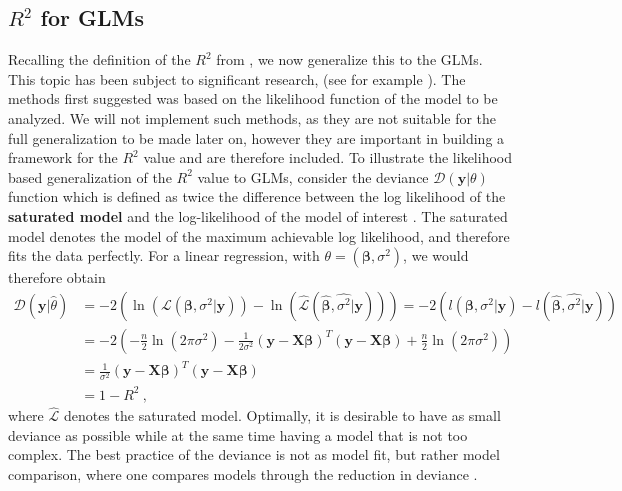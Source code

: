 \subsection{$R^2$ for GLMs}
Recalling the definition of the $R^2$ from , we now generalize this to the GLMs. This topic has been subject to significant research, (see for example \citet{maddala1983limited, cameron1997r, menard2000coefficients,  nakagawa2013general}). The methods first suggested was based on the likelihood function of the model to be analyzed. We will not implement such methods, as they are not suitable for the full generalization to be made later on, however they are important in building a framework for the $R^2$ value and are therefore included.
To illustrate the likelihood based generalization of the $R^2$ value to GLMs, consider the deviance $\mathcal{D}(\mathbf{y}\lvert \theta)$ function which is defined as twice the difference between the log likelihood of the \textbf{saturated model} and the log-likelihood of the model of interest \citep{GLMM_book_old}.
The saturated model denotes the model of the maximum achievable log likelihood, and therefore fits the data perfectly. 
For a linear regression, with $\theta=(\boldsymbol{\beta}, \sigma^2)$, we would therefore obtain
\begin{equation}
    \begin{aligned}
    \mathcal{D}(\mathbf{y}\lvert \hat{\theta}) &= -2\left( \ln(\mathcal{L}(\boldsymbol{\beta}, \sigma^2 \lvert \mathbf{y})) - \ln(\mathcal{\hat{L}}(\boldsymbol{\hat{\beta}}, \hat{\sigma^2} \lvert \mathbf{y}))  \right) = -2\left( l(\boldsymbol{\beta}, \sigma^2 \lvert \mathbf{y}) - l(\boldsymbol{\hat{\beta}}, \hat{\sigma^2} \lvert \mathbf{y})  \right) \\
    & = -2\left(-\frac{n}{2}\ln(2\pi\sigma^2) - \frac{1}{2\sigma^2} (\mathbf{y}-\mathbf{X}\boldsymbol{\beta})^T(\mathbf{y}-\mathbf{X}\boldsymbol{\beta}) + \frac{n}{2}\ln(2\pi\sigma^2)  \right) \\
    & = \frac{1}{\sigma^2} (\mathbf{y}-\mathbf{X}\boldsymbol{\beta})^T(\mathbf{y}-\mathbf{X}\boldsymbol{\beta}) \\
    & = 1-R^2 \ ,
    \end{aligned}
\end{equation}
where $\mathcal{\hat{L}}$ denotes the saturated model.
Optimally, it is desirable to have as small deviance as possible while at the same time having a model that is not too complex.
The best practice of the deviance is not as model fit, but rather model comparison, where one compares models through the reduction in deviance \citep{GLMM_book_old}.
